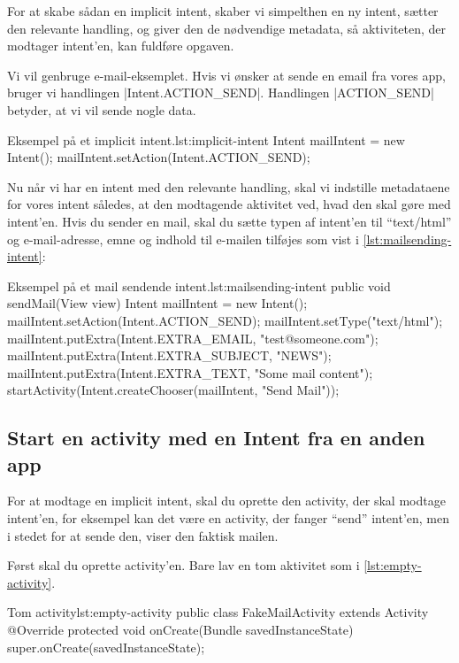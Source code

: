 For at skabe sådan en implicit intent, skaber vi simpelthen en ny intent, sætter den relevante handling, og giver den de nødvendige metadata, så aktiviteten, der modtager intent'en, kan fuldføre opgaven.

Vi vil genbruge e-mail-eksemplet. Hvis vi ønsker at sende en email fra vores app, bruger vi handlingen \JavaInline|Intent.ACTION_SEND|. Handlingen \JavaInline|ACTION_SEND| betyder, at vi vil sende nogle data.

\begin{JavaCode}{Eksempel på et implicit intent.}{lst:implicit-intent}
	Intent mailIntent = new Intent();
	mailIntent.setAction(Intent.ACTION_SEND);
\end{JavaCode}

Nu når vi har en intent med den relevante handling, skal vi indstille metadataene for vores intent således, at den modtagende aktivitet ved, hvad den skal gøre med intent'en. Hvis du sender en mail, skal du sætte typen af intent'en til ``text/html'' og e-mail-adresse, emne og indhold til e-mailen tilføjes som vist i \autoref{lst:mailsending-intent}:

\begin{JavaCode}{Eksempel på et mail sendende intent.}{lst:mailsending-intent}
	public void sendMail(View view) {
		Intent mailIntent = new Intent();
		mailIntent.setAction(Intent.ACTION_SEND);
		mailIntent.setType("text/html");
		mailIntent.putExtra(Intent.EXTRA_EMAIL, "test@someone.com");
		mailIntent.putExtra(Intent.EXTRA_SUBJECT, "NEWS");
		mailIntent.putExtra(Intent.EXTRA_TEXT, "Some mail content");
		startActivity(Intent.createChooser(mailIntent, "Send Mail"));
	}
\end{JavaCode}

\subsection{Start en activity med en Intent fra en anden app}

For at modtage en implicit intent, skal du oprette den activity, der skal modtage intent'en, for eksempel kan det være en activity, der fanger ``send'' intent'en, men i stedet for at sende den, viser den faktisk mailen.

Først skal du oprette activity'en. Bare lav en tom aktivitet som i \autoref{lst:empty-activity}.

\begin{JavaCode}{Tom activity}{lst:empty-activity}
	public class FakeMailActivity extends Activity {
		@Override
		protected void onCreate(Bundle savedInstanceState) {
			super.onCreate(savedInstanceState);
		}
	}
\end{JavaCode}

